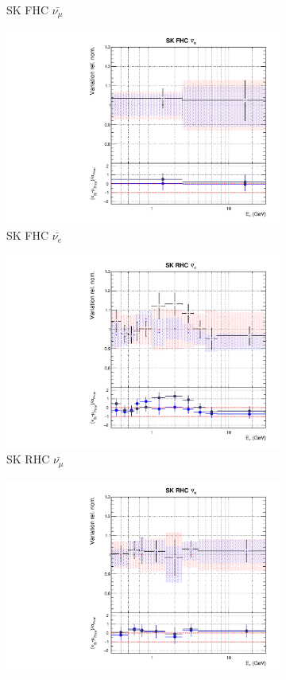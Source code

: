 \begin{figure}[t]
\begin{subfigure}{0.24\textwidth}
  \caption{SK FHC $\bar{\nu_{\mu}}$}
\end{subfigure}
\begin{subfigure}{0.24\textwidth}
  \centering
  \includegraphics[width=0.95\linewidth]{figs/rhcmpdat28flux_11}
  \caption{SK FHC $\bar{\nu_{e}}$}
\end{subfigure}
\begin{subfigure}{0.24\textwidth}
  \centering
  \includegraphics[width=0.95\linewidth]{figs/rhcmpdat28flux_12}
  \caption{SK RHC $\bar{\nu_{\mu}}$}
\end{subfigure}
\begin{subfigure}{0.24\textwidth}
  \centering
  \includegraphics[width=0.95\linewidth]{figs/rhcmpdat28flux_13}

\end{subfigure}
\end{figure}
